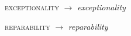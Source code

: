 \begin{ontologytop}
\begin{classlist}
		\begin{proplist}

		\item \textsc{exceptionality} $\rightarrow$  \emph{exceptionality}

		\item \textsc{reparability} $\rightarrow$  \emph{reparability}

		\end{proplist}

	\end{classlist}

\end{ontologytop}

